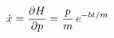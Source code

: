 \documentclass[preview]{standalone}
\begin{document}
\begin{align*}
\special{dvisvgm:raw <g id='unique000'>}\dot{x} = \frac{\partial H}{\partial p} = \frac{p}{m}\,e^{-bt/m}\special{dvisvgm:raw </g>}
\end{align*}
\end{document}
